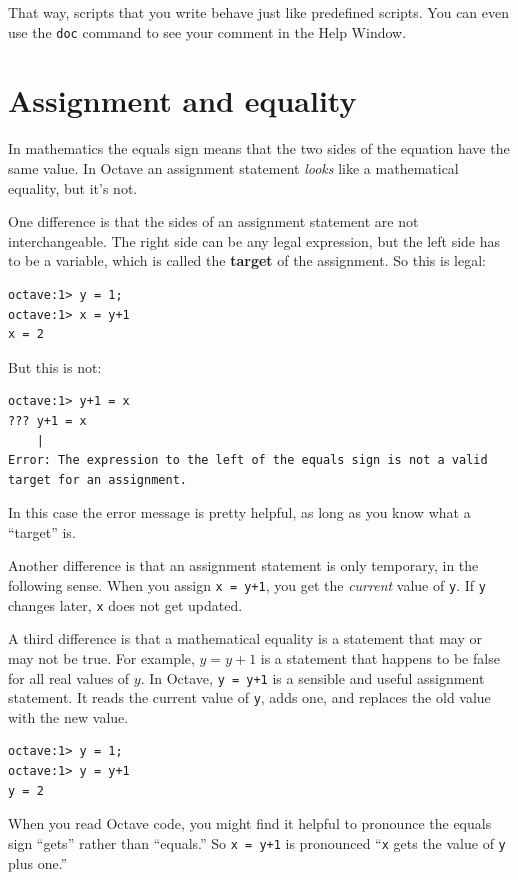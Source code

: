 \documentclass{book}
\begin{document}
That way, scripts that you write behave just like predefined scripts.
You can even use the {\tt doc} command to see your comment in the
Help Window.

\section{Assignment and equality}

In mathematics the equals sign means that the two sides of the
equation have the same value. In Octave an assignment statement
{\em looks} like a mathematical equality, but it's not.

One difference is that the sides of an assignment statement are not
interchangeable. The right side can be any legal expression, but
the left side has to be a variable, which is called the {\bf
target} of the assignment. So this is legal:

\begin{verbatim}
octave:1> y = 1;
octave:1> x = y+1
x = 2
\end{verbatim}

But this is not:

\begin{verbatim}
octave:1> y+1 = x
??? y+1 = x
    |
Error: The expression to the left of the equals sign is not a valid 
target for an assignment.
\end{verbatim}

In this case the error message is pretty helpful, as long as you know
what a ``target'' is.

Another difference is that an assignment statement is only temporary,
in the following sense. When you assign {\tt x = y+1}, you get the
{\em current} value of {\tt y}. If {\tt y} changes later, {\tt x}
does not get updated.

A third difference is that a mathematical equality is a statement that
may or may not be true. For example, $y = y+1$ is a statement that
happens to be false for all real values of $y$. In Octave, {\tt y
= y+1} is a sensible and useful assignment statement. It reads the
current value of {\tt y}, adds one, and replaces the old value with
the new value.

\begin{verbatim}
octave:1> y = 1;
octave:1> y = y+1
y = 2
\end{verbatim}

When you read Octave code, you might find it helpful to pronounce
the equals sign ``gets'' rather than ``equals.'' So {\tt x = y+1}
is pronounced ``{\tt x} gets the value of {\tt y} plus one.''
\end{document}
